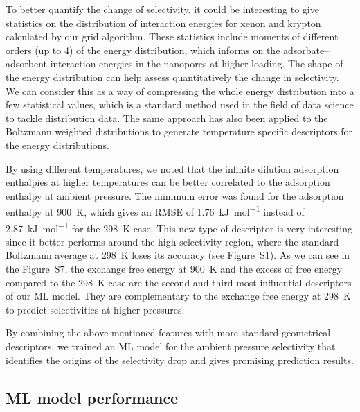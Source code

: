 \documentclass[main]{subfiles}
\begin{document}
To better quantify the change of selectivity, it could be interesting to give statistics on the distribution of interaction energies for xenon and krypton calculated by our grid algorithm. These statistics include moments of different orders (up to 4) of the energy distribution, which informs on the adsorbate--adsorbent interaction energies in the nanopores at higher loading. The shape of the energy distribution can help assess quantitatively the change in selectivity. We can consider this as a way of compressing the whole energy distribution into a few statistical values, which is a standard method used in the field of data science to tackle distribution data. The same approach has also been applied to the Boltzmann weighted distributions to generate temperature specific descriptors for the energy distributions.

By using different temperatures, we noted that the infinite dilution adsorption enthalpies at higher temperatures can be better correlated to the adsorption enthalpy at ambient pressure. The minimum error was found for the adsorption enthalpy at \SI{900}{\kelvin}, which gives an RMSE of \SI{1.76}{\kilo\joule\per\mole} instead of \SI{2.87}{\kilo\joule\per\mole} for the \SI{298}{\kelvin} case. This new type of descriptor is very interesting since it better performs around the high selectivity region, where the standard Boltzmann average at \SI{298}{\kelvin} loses its accuracy (see Figure~S1). As we can see in the Figure~S7, the exchange free energy at \SI{900}{\kelvin} and the excess of free energy compared to the \SI{298}{\kelvin} case are the second and third most influential descriptors of our ML model. They are complementary to the exchange free energy at \SI{298}{\kelvin} to predict selectivities at higher pressures.

By combining the above-mentioned features with more standard geometrical descriptors, we trained an ML model for the ambient pressure selectivity that identifies the origins of the selectivity drop and gives promising prediction results.

\subsection{ML model performance}
\end{document}
